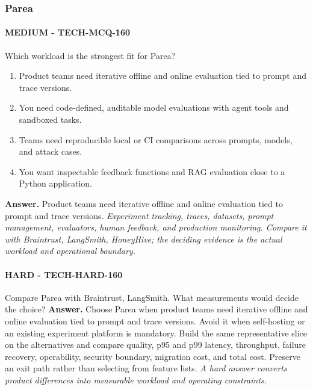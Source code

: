 \subsubsection*{Parea}
\paragraph{MEDIUM - TECH-MCQ-160} Which workload is the strongest fit for Parea?
\begin{enumerate}[label=\Alph*.]
\item Product teams need iterative offline and online evaluation tied to prompt and trace versions.
\item You need code-defined, auditable model evaluations with agent tools and sandboxed tasks.
\item Teams need reproducible local or CI comparisons across prompts, models, and attack cases.
\item You want inspectable feedback functions and RAG evaluation close to a Python application.
\end{enumerate}
\textbf{Answer.} Product teams need iterative offline and online evaluation tied to prompt and trace versions.
\textit{Experiment tracking, traces, datasets, prompt management, evaluators, human feedback, and production monitoring. Compare it with Braintrust, LangSmith, HoneyHive; the deciding evidence is the actual workload and operational boundary.}
\paragraph{HARD - TECH-HARD-160} Compare Parea with Braintrust, LangSmith. What measurements would decide the choice?
\textbf{Answer.} Choose Parea when product teams need iterative offline and online evaluation tied to prompt and trace versions. Avoid it when self-hosting or an existing experiment platform is mandatory. Build the same representative slice on the alternatives and compare quality, p95 and p99 latency, throughput, failure recovery, operability, security boundary, migration cost, and total cost. Preserve an exit path rather than selecting from feature lists.
\textit{A hard answer converts product differences into measurable workload and operating constraints.}
